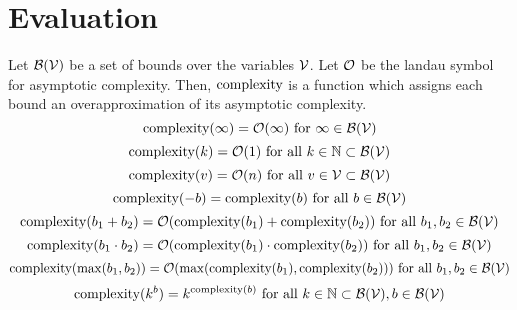 \section{Evaluation}

\begin{definition}
  Let $\mathcal{B}(\mathcal{V})$ be a set of bounds over the variables $\mathcal{V}$.
  Let $\mathcal{O}$ be the landau symbol for asymptotic complexity.
  Then, $\text{complexity}$ is a function which assigns each bound an overapproximation of its asymptotic complexity.
  \[ \text{complexity}(\infty) = \mathcal{O}(\infty) \text{ for } \infty \in \mathcal{B}(\mathcal{V}) \]
  \[ \text{complexity}(k) = \mathcal{O}(1) \text{ for all } k \in \mathbb{N} \subset \mathcal{B}(\mathcal{V}) \] 
  \[ \text{complexity}(v) = \mathcal{O}(n) \text{ for all } v \in \mathcal{V} \subset \mathcal{B}(\mathcal{V}) \] 
  \[ \text{complexity}(-b) = \text{complexity}(b) \text{ for all } b \in \mathcal{B}(\mathcal{V}) \] 
  \[ \text{complexity}(b_1 + b_2) = \mathcal{O}(\text{complexity}(b_1) + \text{complexity}(b_2)) \text{ for all } b_1, b_2 \in \mathcal{B}(\mathcal{V}) \] 
  \[ \text{complexity}(b_1 \cdot b_2) = \mathcal{O}(\text{complexity}(b_1) \cdot \text{complexity}(b_2)) \text{ for all } b_1, b_2 \in \mathcal{B}(\mathcal{V}) \] 
  \[ \text{complexity}(\max(b_1, b_2)) = \mathcal{O}(\max(\text{complexity}(b_1), \text{complexity}(b_2))) \text{ for all } b_1, b_2 \in \mathcal{B}(\mathcal{V}) \]
  \[ \text{complexity}(k^b) = k^{\text{complexity}(b)} \text{ for all } k \in \mathbb{N} \subset \mathcal{B}(\mathcal{V}), b \in \mathcal{B}(\mathcal{V}) \]  
\end{definition}

\begin{center}
  \hfil
\end{center}
